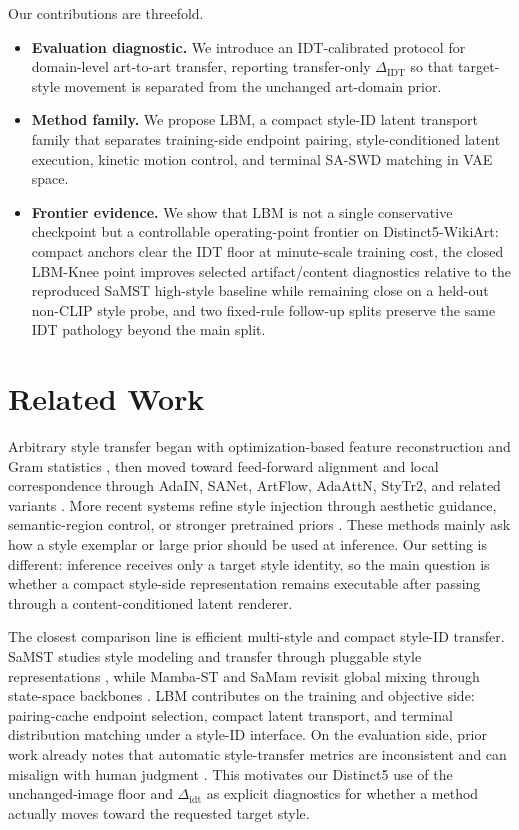 \documentclass[letterpaper]{article}
\begin{document}
Our contributions are threefold.
\begin{itemize}
    \item \textbf{Evaluation diagnostic.} We introduce an IDT-calibrated protocol for domain-level art-to-art transfer, reporting transfer-only $\Delta_{\mathrm{IDT}}$ so that target-style movement is separated from the unchanged art-domain prior.
    \item \textbf{Method family.} We propose LBM, a compact style-ID latent transport family that separates training-side endpoint pairing, style-conditioned latent execution, kinetic motion control, and terminal SA-SWD matching in VAE space.
    \item \textbf{Frontier evidence.} We show that LBM is not a single conservative checkpoint but a controllable operating-point frontier on Distinct5-WikiArt: compact anchors clear the IDT floor at minute-scale training cost, the closed LBM-Knee point improves selected artifact/content diagnostics relative to the reproduced SaMST high-style baseline while remaining close on a held-out non-CLIP style probe, and two fixed-rule follow-up splits preserve the same IDT pathology beyond the main split.
\end{itemize}

\section{Related Work}
Arbitrary style transfer began with optimization-based feature reconstruction and Gram statistics \cite{gatys2016image}, then moved toward feed-forward alignment and local correspondence through AdaIN, SANet, ArtFlow, AdaAttN, StyTr2, and related variants \cite{huang2017adain,park2019sanet,an2021artflow,liu2021adaattn,deng2022stytr2}. More recent systems refine style injection through aesthetic guidance, semantic-region control, or stronger pretrained priors \cite{hong2023aespa,huang2024aesfa,zheng2024puffnet,zhang2025hsi,shang2025scsa,zhang2024artbank,chung2024styleid,deng2024zstar}. These methods mainly ask how a style exemplar or large prior should be used at inference. Our setting is different: inference receives only a target style identity, so the main question is whether a compact style-side representation remains executable after passing through a content-conditioned latent renderer.

The closest comparison line is efficient multi-style and compact style-ID transfer. SaMST studies style modeling and transfer through pluggable style representations \cite{liu2024samst}, while Mamba-ST and SaMam revisit global mixing through state-space backbones \cite{botti2025mambast,liu2025samam}. LBM contributes on the training and objective side: pairing-cache endpoint selection, compact latent transport, and terminal distribution matching under a style-ID interface. On the evaluation side, prior work already notes that automatic style-transfer metrics are inconsistent and can misalign with human judgment \cite{zhou2024comprehensiveeval,yeh2020calibrated,wright2022artfid}. This motivates our Distinct5 use of the unchanged-image floor and $\Delta_{\mathrm{idt}}$ as explicit diagnostics for whether a method actually moves toward the requested target style.
\end{document}
